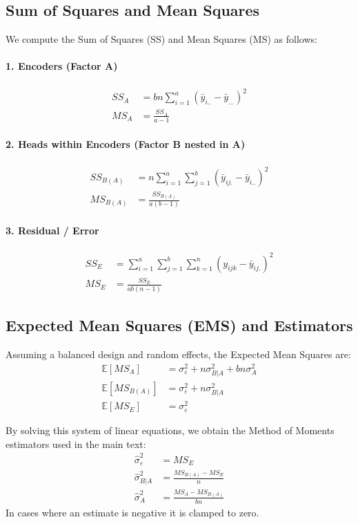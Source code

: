 \subsection{Sum of Squares and Mean Squares}
We compute the Sum of Squares (SS) and Mean Squares (MS) as follows:

\paragraph{1. Encoders (Factor A)}
\begin{align}
SS_A &= b n \sum_{i=1}^{a} (\bar{y}_{i..} - \bar{y}_{...})^2 \\
MS_A &= \frac{SS_A}{a - 1}
\end{align}

\paragraph{2. Heads within Encoders (Factor B nested in A)}
\begin{align}
SS_{B(A)} &= n \sum_{i=1}^{a} \sum_{j=1}^{b} (\bar{y}_{ij.} - \bar{y}_{i..})^2 \\
MS_{B(A)} &= \frac{SS_{B(A)}}{a(b - 1)}
\end{align}

\paragraph{3. Residual / Error}
\begin{align}
SS_E &= \sum_{i=1}^{a} \sum_{j=1}^{b} \sum_{k=1}^{n} (y_{ijk} - \bar{y}_{ij.})^2 \\
MS_E &= \frac{SS_E}{ab(n - 1)}
\end{align}

\subsection{Expected Mean Squares (EMS) and Estimators}
Assuming a balanced design and random effects, the Expected Mean Squares are:
\begin{align}
\mathbb{E}[MS_A] &= \sigma_\varepsilon^2 + n \sigma_{B|A}^2 + bn \sigma_A^2 \\
\mathbb{E}[MS_{B(A)}] &= \sigma_\varepsilon^2 + n \sigma_{B|A}^2 \\
\mathbb{E}[MS_E] &= \sigma_\varepsilon^2
\end{align}

By solving this system of linear equations, we obtain the Method of Moments estimators used in the main text:
\begin{align}
\hat{\sigma}_\varepsilon^2 &= MS_E \\
\hat{\sigma}_{B|A}^2 &= \frac{MS_{B(A)} - MS_E}{n} \\
\hat{\sigma}_A^2 &= \frac{MS_A - MS_{B(A)}}{bn}
\end{align}
In cases where an estimate is negative it is clamped to zero.

